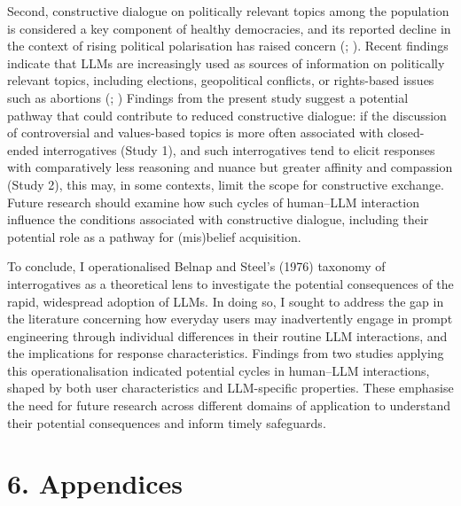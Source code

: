 \documentclass[
  12pt,
]{article}
\begin{document}
Second, constructive dialogue on politically relevant topics among the population is considered a key component of healthy democracies, and its reported decline in the context of rising political polarisation has raised concern (; ). Recent findings indicate that LLMs are increasingly used as sources of information on politically relevant topics, including elections, geopolitical conflicts, or rights-based issues such as abortions (; ) Findings from the present study suggest a potential pathway that could contribute to reduced constructive dialogue: if the discussion of controversial and values-based topics is more often associated with closed-ended interrogatives (Study 1), and such interrogatives tend to elicit responses with comparatively less reasoning and nuance but greater affinity and compassion (Study 2), this may, in some contexts, limit the scope for constructive exchange. Future research should examine how such cycles of human--LLM interaction influence the conditions associated with constructive dialogue, including their potential role as a pathway for (mis)belief acquisition.

To conclude, I operationalised Belnap and Steel's (1976) taxonomy of interrogatives as a theoretical lens to investigate the potential consequences of the rapid, widespread adoption of LLMs. In doing so, I sought to address the gap in the literature concerning how everyday users may inadvertently engage in prompt engineering through individual differences in their routine LLM interactions, and the implications for response characteristics. Findings from two studies applying this operationalisation indicated potential cycles in human--LLM interactions, shaped by both user characteristics and LLM-specific properties. These emphasise the need for future research across different domains of application to understand their potential consequences and inform timely safeguards.

\clearpage

\section{6. Appendices}\label{appendices}
\end{document}
